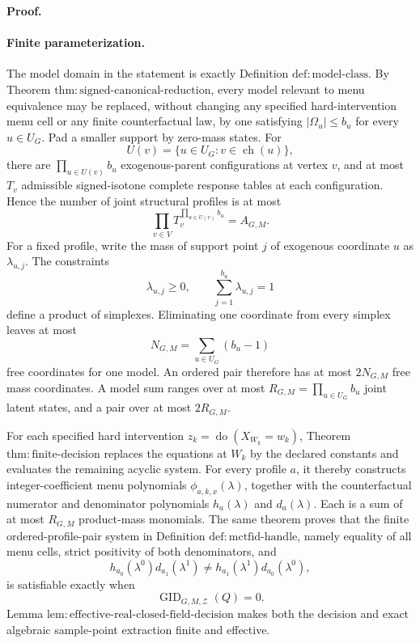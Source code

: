 \textbf{Proof.}
\paragraph{Finite parameterization.}
The model domain in the statement is exactly Definition \(\mathrm{def:model\text{-}class}\).  By Theorem \(\mathrm{thm:signed\text{-}canonical\text{-}reduction}\), every model relevant to menu equivalence may be replaced, without changing any specified hard-intervention menu cell or any finite counterfactual law, by one satisfying \(|\Omega_u|\le b_u\) for every \(u\in U_G\).  Pad a smaller support by zero-mass states.  For
\[
 U(v)=\{u\in U_G:v\in\operatorname{ch}(u)\},
\]
there are \(\prod_{u\in U(v)}b_u\) exogenous-parent configurations at vertex \(v\), and at most \(T_v\) admissible signed-isotone complete response tables at each configuration.  Hence the number of joint structural profiles is at most
\[
 \prod_{v\in V}T_v^{\prod_{u\in U(v)}b_u}=A_{G,M}.
\tag{1}
\]
For a fixed profile, write the mass of support point \(j\) of exogenous coordinate \(u\) as \(\lambda_{u,j}\).  The constraints
\[
 \lambda_{u,j}\ge0,
 \qquad
 \sum_{j=1}^{b_u}\lambda_{u,j}=1
\tag{2}
\]
define a product of simplexes.  Eliminating one coordinate from every simplex leaves at most
\[
 N_{G,M}=\sum_{u\in U_G}(b_u-1)
\tag{3}
\]
free coordinates for one model.  An ordered pair therefore has at most \(2N_{G,M}\) free mass coordinates.  A model sum ranges over at most \(R_{G,M}=\prod_{u\in U_G}b_u\) joint latent states, and a pair over at most \(2R_{G,M}\).

For each specified hard intervention \(z_k=\operatorname{do}(X_{W_k}=w_k)\), Theorem \(\mathrm{thm:finite\text{-}decision}\) replaces the equations at \(W_k\) by the declared constants and evaluates the remaining acyclic system.  For every profile \(a\), it thereby constructs integer-coefficient menu polynomials \(\phi_{a,k,x}(\lambda)\), together with the counterfactual numerator and denominator polynomials \(h_a(\lambda)\) and \(d_a(\lambda)\).  Each is a sum of at most \(R_{G,M}\) product-mass monomials.  The same theorem proves that the finite ordered-profile-pair system in Definition \(\mathrm{def:mctfid\text{-}handle}\), namely equality of all menu cells, strict positivity of both denominators, and
\[
 h_{a_0}(\lambda^0)d_{a_1}(\lambda^1)
 \ne
 h_{a_1}(\lambda^1)d_{a_0}(\lambda^0),
\tag{4}
\]
is satisfiable exactly when
\[
 \operatorname{GID}_{G,M,\mathcal Z}(Q)=0.
\tag{5}
\]
Lemma \(\mathrm{lem:effective\text{-}real\text{-}closed\text{-}field\text{-}decision}\) makes both the decision and exact algebraic sample-point extraction finite and effective.

